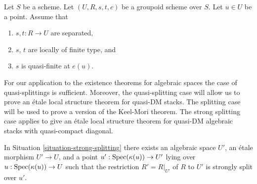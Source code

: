 \begin{situation}
\label{situation-quasi-splitting}
Let $S$ be a scheme.
Let $(U, R, s, t, c)$ be a groupoid scheme over $S$.
Let $u \in U$ be a point. Assume that
\begin{enumerate}
\item $s, t : R \to U$ are separated,
\item $s$, $t$ are locally of finite type, and
\item $s$ is quasi-finite at $e(u)$.
\end{enumerate}
\end{situation}

\noindent
For our application to the existence theorems for algebraic spaces
the case of quasi-splittings is sufficient. Moreover, the quasi-splitting
case will allow us to prove an \'etale local structure theorem for
quasi-DM stacks. The splitting case will be used to prove a version
of the Keel-Mori theorem. The strong splitting case applies to give
an \'etale local structure theorem for quasi-DM algebraic stacks
with quasi-compact diagonal.

\begin{lemma}
\label{lemma-strong-splitting}
In Situation \ref{situation-strong-splitting}
there exists an algebraic space $U'$, an \'etale morphism
$U' \to U$, and a point $u' : \mathop{\mathrm{Spec}}(\kappa(u)) \to U'$
lying over $u : \mathop{\mathrm{Spec}}(\kappa(u)) \to U$
such that the restriction $R' = R|_{U'}$ of $R$ to $U'$
is strongly split over $u'$.
\end{lemma}

